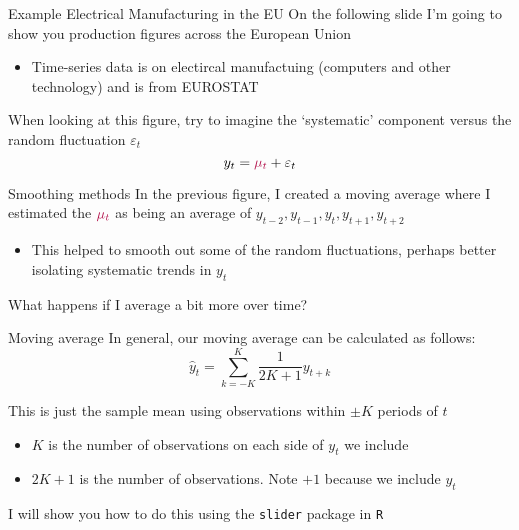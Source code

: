 \documentclass[aspectratio=169,t,11pt,table]{beamer}
\begin{document}
\begin{frame}{Example Electrical Manufacturing in the EU}
  On the following slide I'm going to show you production figures across the European Union
  \begin{itemize}
    \item Time-series data is on electircal manufactuing (computers and other technology) and is from EUROSTAT 
  \end{itemize}

  \bigskip
  When looking at this figure, try to imagine the `systematic' component versus the random fluctuation $\varepsilon_t$
  $$
    y_t = {\color[HTML]{B3114B} \mu_t} + \varepsilon_t
  $$
\end{frame}


\begin{frame}{Smoothing methods}
  In the previous figure, I created a \alert{moving average} where I estimated the ${\color[HTML]{B3114B} \mu_t}$ as being an average of $y_{t-2}, y_{t-1}, y_{t}, y_{t+1}, y_{t+2}$

  \begin{itemize}
    \item This helped to smooth out some of the random fluctuations, perhaps better isolating systematic trends in $y_t$
  \end{itemize}

  \bigskip
  \pause
  What happens if I average a bit more over time?
\end{frame}


\begin{frame}{Moving average}
  In general, our moving average can be calculated as follows:
  $$
    \hat{y}_t = \sum_{k=-K}^K \frac{1}{2K+1} y_{t + k}
  $$

  \bigskip
  This is just the sample mean using observations within $\pm K$ periods of $t$
  \begin{itemize}
    \item $K$ is the number of observations on each side of $y_t$ we include
    \item $2K+1$ is the number of observations. Note $+1$ because we include $y_t$
  \end{itemize}
  
  \pause
  \bigskip
  I will show you how to do this using the \texttt{slider} package in \texttt{R}
\end{frame}
\end{document}
